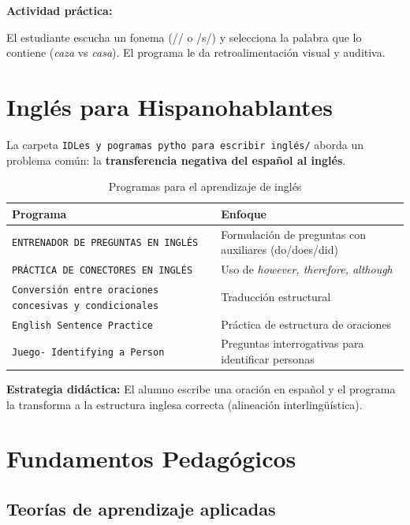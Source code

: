 \documentclass[12pt,spanish]{article}
\begin{document}
\begin{ejemplo}
\textbf{Actividad práctica:}

El estudiante escucha un fonema (/\texttheta/ o /s/) y selecciona la palabra que lo contiene (\textit{caza} vs \textit{casa}). El programa le da retroalimentación visual y auditiva.
\end{ejemplo}

\section{Inglés para Hispanohablantes}

La carpeta \texttt{IDLes y pogramas pytho para escribir inglés/} aborda un problema común: la \textbf{transferencia negativa del español al inglés}.

\begin{table}[H]
\centering
\caption{Programas para el aprendizaje de inglés}
\label{tab:ingles}
\begin{tabular}{|p{5.5cm}|p{8cm}|}
\hline
\textbf{Programa} & \textbf{Enfoque} \\
\hline
\texttt{ENTRENADOR DE PREGUNTAS EN INGLÉS} & Formulación de preguntas con auxiliares (do/does/did) \\
\hline
\texttt{PRÁCTICA DE CONECTORES EN INGLÉS} & Uso de \textit{however, therefore, although} \\
\hline
\texttt{Conversión entre oraciones concesivas y condicionales} & Traducción estructural \\
\hline
\texttt{English Sentence Practice} & Práctica de estructura de oraciones \\
\hline
\texttt{Juego- Identifying a Person} & Preguntas interrogativas para identificar personas \\
\hline
\end{tabular}
\end{table}

\begin{nota}
\textbf{Estrategia didáctica:} El alumno escribe una oración en español y el programa la transforma a la estructura inglesa correcta (alineación interlingüística).
\end{nota}

\section{Fundamentos Pedagógicos}

\subsection{Teorías de aprendizaje aplicadas}
\end{document}
